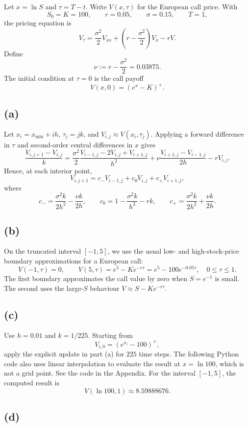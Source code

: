 \documentclass{article}
\begin{document}
Let \(x=\ln S\) and \(\tau=T-t\). Write \(V(x,\tau)\) for the
European call price. With
\[
S_0=K=100,\qquad r=0.05,\qquad \sigma=0.15,\qquad T=1,
\]
the pricing equation is
\[
V_\tau
=\frac{\sigma^2}{2}V_{xx}
+\left(r-\frac{\sigma^2}{2}\right)V_x-rV.
\]
Define
\[
\nu:=r-\frac{\sigma^2}{2}=0.03875.
\]
The initial condition at \(\tau=0\) is the call payoff
\[
V(x,0)=(e^x-K)^+.
\]

\subsection*{(a)}

Let \(x_i=x_{\min}+ih\), \(\tau_j=jk\), and
\(V_{i,j}\approx V(x_i,\tau_j)\). Applying a forward difference
in \(\tau\) and second-order central differences in \(x\) gives
\[
\frac{V_{i,j+1}-V_{i,j}}{k}
=
\frac{\sigma^2}{2}
\frac{V_{i-1,j}-2V_{i,j}+V_{i+1,j}}{h^2}
+\nu\frac{V_{i+1,j}-V_{i-1,j}}{2h}
-rV_{i,j}.
\]
Hence, at each interior point,
\[
\boxed{
V_{i,j+1}
=c_-V_{i-1,j}+c_0V_{i,j}+c_+V_{i+1,j},
}
\]
where
\[
c_-=\frac{\sigma^2k}{2h^2}-\frac{\nu k}{2h},
\qquad
c_0=1-\frac{\sigma^2k}{h^2}-rk,
\qquad
c_+=\frac{\sigma^2k}{2h^2}+\frac{\nu k}{2h}.
\]

\subsection*{(b)}

On the truncated interval \([-1,5]\), we use the usual
low- and high-stock-price boundary approximations for a
European call:
\[
\boxed{
V(-1,\tau)=0,\qquad
V(5,\tau)=e^5-Ke^{-r\tau}
        =e^5-100e^{-0.05\tau},
\quad 0\leq\tau\leq1.
}
\]
The first boundary approximates the call value by zero when
\(S=e^{-1}\) is small. The second uses the large-\(S\) behaviour
\(V\approx S-Ke^{-r\tau}\).

\subsection*{(c)}
Use \(h=0.01\) and \(k=1/225\). Starting from
\[
V_{i,0}=(e^{x_i}-100)^+,
\]
apply the explicit update in part (a) for \(225\) time steps.
The following Python code also uses linear interpolation to
evaluate the result at \(x=\ln100\), which is not a grid point. See the code in the Appendix. For the interval \([-1,5]\), the computed result is
\[
\boxed{V(\ln100,1)\approx 8.59888676.}
\]

\subsection*{(d)}
\end{document}
